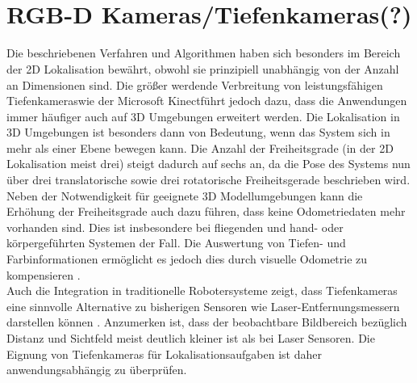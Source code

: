 \\


\\


\section{RGB-D Kameras/Tiefenkameras(?)}
Die beschriebenen Verfahren und Algorithmen haben sich besonders im Bereich der 2D Lokalisation bewährt, obwohl sie prinzipiell unabhängig von der Anzahl an Dimensionen sind. Die größer werdende Verbreitung von \red[bezahlbaren] leistungsfähigen Tiefenkameras wie der Microsoft Kinect\red[Tm] führt jedoch dazu, dass die Anwendungen immer häufiger auch auf 3D Umgebungen erweitert werden. Die Lokalisation in 3D Umgebungen ist besonders dann von Bedeutung, wenn das System sich in mehr als einer Ebene bewegen kann. Die Anzahl der Freiheitsgrade (in der 2D Lokalisation meist drei) steigt dadurch auf sechs an, da die Pose des Systems nun über drei translatorische sowie drei rotatorische Freiheitsgerade beschrieben wird. Neben der Notwendigkeit für geeignete 3D Modellumgebungen kann die Erhöhung der Freiheitsgrade auch dazu führen, dass keine Odometriedaten mehr vorhanden sind. Dies ist insbesondere bei fliegenden \cite{Huang2011} und hand- oder körpergeführten Systemen \cite{Fallon2012} der Fall. Die Auswertung von Tiefen- und Farbinformationen ermöglicht es jedoch dies durch visuelle Odometrie zu kompensieren \cite{Whelan2013robust}.\\
Auch die Integration in traditionelle Robotersysteme zeigt, dass Tiefenkameras eine sinnvolle Alternative zu bisherigen Sensoren wie Laser-Entfernungsmessern darstellen können \cite{Cunha2011} \cite{Eriksson2012}. Anzumerken ist, dass der beobachtbare Bildbereich bezüglich Distanz und Sichtfeld meist deutlich kleiner ist als bei Laser Sensoren. Die Eignung von Tiefenkameras für Lokalisationsaufgaben ist daher anwendungsabhängig zu überprüfen.\\

